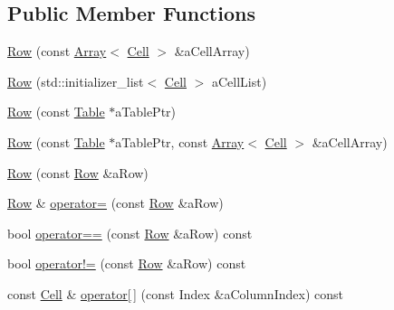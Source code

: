 \subsection*{Public Member Functions}
\begin{DoxyCompactItemize}
\item 
\hyperlink{classostk_1_1core_1_1ctnr_1_1table_1_1_row_a68a821a8394008fc656cec7038d6dfce}{Row} (const \hyperlink{classostk_1_1core_1_1ctnr_1_1_array}{Array}$<$ \hyperlink{namespaceostk_1_1core_1_1ctnr_1_1table_a697fb8eda17fde15703741a0c49036b9}{Cell} $>$ \&a\+Cell\+Array)
\item 
\hyperlink{classostk_1_1core_1_1ctnr_1_1table_1_1_row_a1efb42e05bea930d95c38cf8b6162a7b}{Row} (std\+::initializer\+\_\+list$<$ \hyperlink{namespaceostk_1_1core_1_1ctnr_1_1table_a697fb8eda17fde15703741a0c49036b9}{Cell} $>$ a\+Cell\+List)
\item 
\hyperlink{classostk_1_1core_1_1ctnr_1_1table_1_1_row_ad6789b8b5a533e9d77c508d496fd34e7}{Row} (const \hyperlink{classostk_1_1core_1_1ctnr_1_1_table}{Table} $\ast$a\+Table\+Ptr)
\item 
\hyperlink{classostk_1_1core_1_1ctnr_1_1table_1_1_row_a1e9c6bf33e7f7b4656677e6fac08a205}{Row} (const \hyperlink{classostk_1_1core_1_1ctnr_1_1_table}{Table} $\ast$a\+Table\+Ptr, const \hyperlink{classostk_1_1core_1_1ctnr_1_1_array}{Array}$<$ \hyperlink{namespaceostk_1_1core_1_1ctnr_1_1table_a697fb8eda17fde15703741a0c49036b9}{Cell} $>$ \&a\+Cell\+Array)
\item 
\hyperlink{classostk_1_1core_1_1ctnr_1_1table_1_1_row_aa5b738f8504f61c4b43aebebbcce9938}{Row} (const \hyperlink{classostk_1_1core_1_1ctnr_1_1table_1_1_row}{Row} \&a\+Row)
\item 
\hyperlink{classostk_1_1core_1_1ctnr_1_1table_1_1_row}{Row} \& \hyperlink{classostk_1_1core_1_1ctnr_1_1table_1_1_row_a3d83b95c0bfcdd1a111a8329250f0caf}{operator=} (const \hyperlink{classostk_1_1core_1_1ctnr_1_1table_1_1_row}{Row} \&a\+Row)
\item 
bool \hyperlink{classostk_1_1core_1_1ctnr_1_1table_1_1_row_a2be316029aeee1d6c6bf2040d2a06ec7}{operator==} (const \hyperlink{classostk_1_1core_1_1ctnr_1_1table_1_1_row}{Row} \&a\+Row) const
\item 
bool \hyperlink{classostk_1_1core_1_1ctnr_1_1table_1_1_row_aa42e111b2a251a5d39e8d75e93c397ed}{operator!=} (const \hyperlink{classostk_1_1core_1_1ctnr_1_1table_1_1_row}{Row} \&a\+Row) const
\item 
const \hyperlink{namespaceostk_1_1core_1_1ctnr_1_1table_a697fb8eda17fde15703741a0c49036b9}{Cell} \& \hyperlink{classostk_1_1core_1_1ctnr_1_1table_1_1_row_a74f6773d021b59498c636bf32be0e8ab}{operator\mbox{[}$\,$\mbox{]}} (const Index \&a\+Column\+Index) const

\end{DoxyCompactItemize}
